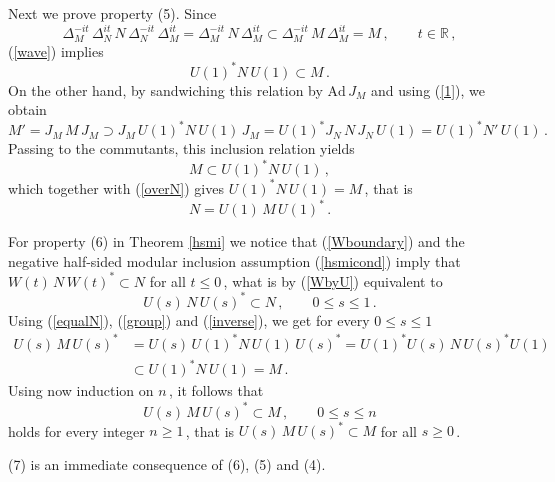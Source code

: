 \documentclass[reqno]{amsart}
\theoremstyle{definition}
\theoremstyle{remark}
\numberwithin{equation}{section}
\theoremstyle{plain}
\begin{document}
Next we prove property (5). Since
\begin{equation*}
\Delta_M^{-i t}\,\Delta_N^{i t}\, N\,\Delta_N^{-i t}\,\Delta_M^{i t}
=\Delta_M^{-i t}\, N\,\Delta_M^{i t}\subset
\Delta_M^{-i t}\, M\,\Delta_M^{i t} =M\, ,\qquad t\in\mathbb R\, ,
\end{equation*}
(\ref{wave}) implies
\begin{equation}\label{overN}
U(1)^* N\, U(1)\subset M\, .
\end{equation}
On the other hand, by sandwiching this relation by $\text{Ad}\, J_M$
and using (\ref{1}), we obtain
\begin{equation*}
M' =J_M\, M\, J_M\supset J_M\, U(1)^* N\, U(1)\, J_M =
U(1)^* J_N\, N\, J_N\, U(1) =U(1)^* N'\, U(1)\, .
\end{equation*}
Passing to the commutants, this inclusion relation yields
\begin{equation*}
M\subset U(1)^* N\, U(1)\, ,
\end{equation*}
which together with (\ref{overN}) gives $U(1)^* N\, U(1)=M\,$,
that is
\begin{equation}\label{equalN}
N=U(1)\, M\, U(1)^*\, .
\end{equation}

For property (6) in Theorem \ref{hsmi} we notice that
(\ref{Wboundary}) and the negative half-sided modular inclusion
assumption (\ref{hsmicond}) imply that $W(t)\, N\, W(t)^*\subset N$
for all $t\leq 0\,$, what is by (\ref{WbyU}) equivalent to
\begin{equation*}
U(s)\, N\, U(s)^*\subset N\, ,\qquad 0\leq s\leq 1\, .
\end{equation*}
Using (\ref{equalN}), (\ref{group}) and (\ref{inverse}), we get
for every $0\leq s\leq 1$
\begin{equation*}
\begin{split}
U(s)\, M\, U(s)^* &=U(s)\, U(1)^* N\, U(1)\, U(s)^* =
U(1)^* U(s)\, N\, U(s)^* U(1) \\
&\subset U(1)^* N\, U(1)=M\, .
\end{split}
\end{equation*}
Using now induction on $n\,$, it follows that
\begin{equation*}
U(s)\, M\, U(s)^*\subset M\, ,\qquad 0\leq s\leq n
\end{equation*}
holds for every integer $n\geq 1\,$, that is $U(s)\, M\, U(s)^*
\subset M$ for all $s\geq 0\,$.

(7) is an immediate consequence of (6), (5) and (4).
\bigskip
\end{document}
